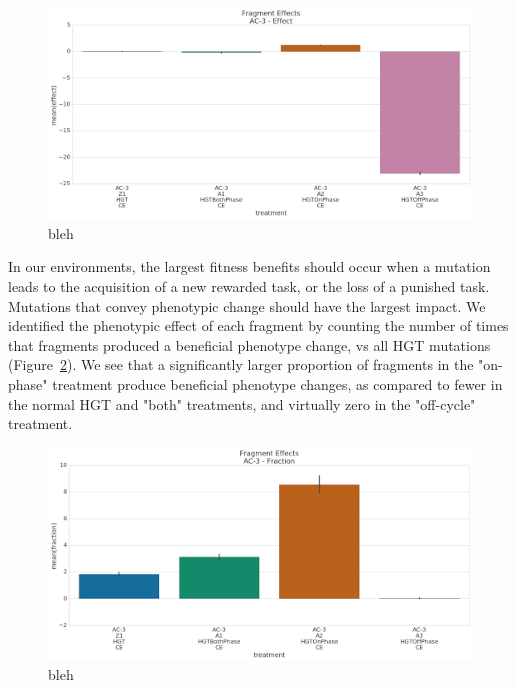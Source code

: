 \documentclass[PhD]{msu-thesis}
\begin{document}
\begin{figure}[h!]
\begin{center}
\includegraphics[width=0.7\columnwidth]{figures/HGT/fitness_effect_by_cycle_phase_source.png}
\caption{bleh%
}\label{fig:fitness_effect_by_cycle_phase_source}
\end{center}
\end{figure}

In our environments, the largest fitness benefits should occur when a mutation leads to the acquisition of a new rewarded task, or the loss of a punished task. Mutations that convey phenotypic change should have the largest impact. We identified the phenotypic effect of each fragment by counting the number of times that fragments produced a beneficial phenotype change, vs all HGT mutations (Figure~\ref{fig:beneficial_fraction_by_cycle_phase_source}). We see that a significantly larger proportion of fragments in the "on-phase" treatment produce beneficial phenotype changes, as compared to fewer in the normal HGT and "both" treatments, and virtually zero in the "off-cycle" treatment. 

\begin{figure}[h!]
\begin{center}
\includegraphics[width=0.7\columnwidth]{figures/HGT/beneficial_fraction_by_cycle_phase_source.png}
\caption{bleh%
}\label{fig:beneficial_fraction_by_cycle_phase_source}
\end{center}
\end{figure}
\end{document}
